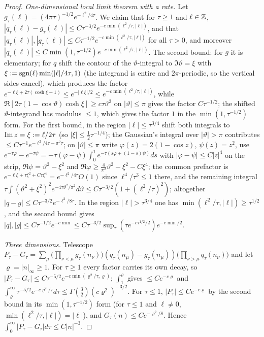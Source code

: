 \begin{proof}
\emph{One-dimensional local limit theorem with a rate.} Let $g_\tau(\ell)=(4\pi\tau)^{-1/2}e^{-\ell^2/4\tau}$. We claim that for $\tau\ge1$ and $\ell\in\mathbb Z$, $|q_\tau(\ell)-g_\tau(\ell)|\le C\tau^{-3/2}e^{-c\min(\ell^2/\tau,|\ell|)}$, and that $|q_\tau(\ell)|,|g_\tau(\ell)|\le C\tau^{-1/2}e^{-c\min(\ell^2/\tau,|\ell|)}$ for all $\tau>0$, and moreover $|q_\tau(\ell)|\le C\min(1,\tau^{-1/2})e^{-c\min(\ell^2/\tau,|\ell|)}$. The second bound: for $g$ it is elementary; for $q$ shift the contour of the $\vartheta$-integral to $\Im\vartheta=\xi$ with $\xi:=\operatorname{sgn}(\ell)\min(|\ell|/4\tau,1)$ (the integrand is entire and $2\pi$-periodic, so the vertical sides cancel), which produces the factor $e^{-\ell\xi+2\tau(\cosh\xi-1)}\le e^{-|\ell\xi|/2}\le e^{-c\min(\ell^2/\tau,|\ell|)}$, while $\Re[2\tau(1-\cos\vartheta)\cosh\xi]\ge c\tau\vartheta^2$ on $|\vartheta|\le\pi$ gives the factor $C\tau^{-1/2}$; the shifted $\vartheta$-integrand has modulus $\le1$, which gives the factor $1$ in the $\min(1,\tau^{-1/2})$ form. For the first bound, in the region $|\ell|\le\tau^{3/4}$ shift both integrals to $\operatorname{Im} z=\xi:=\ell/2\tau$ (so $|\xi|\le\frac12\tau^{-1/4}$); the Gaussian's integral over $|\vartheta|>\pi$ contributes $\le C\tau^{-1}e^{-\ell^2/4\tau-\pi^2\tau}$; on $|\vartheta|\le\pi$ write $\varphi(z)=2(1-\cos z)$, $\psi(z)=z^2$, use $e^{-\tau\varphi}-e^{-\tau\psi}=-\tau(\varphi-\psi)\int_0^1e^{-\tau(s\varphi+(1-s)\psi)}ds$ with $|\varphi-\psi|\le C|z|^4$ on the strip, $\Re\psi=\vartheta^2-\xi^2$ and $\Re\varphi\ge\frac4{\pi^2}\vartheta^2-\xi^2-C\xi^4$; the common prefactor is $e^{-\ell\xi+\tau\xi^2+C\tau\xi^4}=e^{-\ell^2/4\tau}O(1)$ since $\ell^4/\tau^3\le1$ there, and the remaining integral $\tau\int(\vartheta^2+\xi^2)^2e^{-4\tau\vartheta^2/\pi^2}d\vartheta\le C\tau^{-3/2}(1+(\ell^2/\tau)^2)$; altogether $|q-g|\le C\tau^{-3/2}e^{-\ell^2/8\tau}$. In the region $|\ell|>\tau^{3/4}$ one has $\min(\ell^2/\tau,|\ell|)\ge\tau^{1/2}$, and the second bound gives $|q|,|g|\le C\tau^{-1/2}e^{-c\min}\le C\tau^{-3/2}\sup_\tau(\tau e^{-c\tau^{1/2}/2})e^{-c\min/2}$.

\emph{Three dimensions.} Telescope $P_\tau-G_\tau=\sum_\mu\big(\prod_{\nu<\mu}g_\tau(n_\nu)\big)(q_\tau(n_\mu)-g_\tau(n_\mu))\big(\prod_{\nu>\mu}q_\tau(n_\nu)\big)$ and let $\varrho=|n|_\infty\ge1$. For $\tau\ge1$ every factor carries its own decay, so $|P_\tau-G_\tau|\le C\tau^{-5/2}e^{-c\min(\varrho^2/\tau,\varrho)}$; $\int_1^{\varrho}$ gives $\le Ce^{-c\varrho}$ and $\int_\varrho^\infty\tau^{-5/2}e^{-c\varrho^2/\tau}d\tau\le\Gamma(\frac32)(c\varrho^2)^{-3/2}$. For $\tau\le1$, $|P_\tau|\le Ce^{-c\varrho}$ by the second bound in its $\min(1,\tau^{-1/2})$ form (for $\tau\le1$ and $\ell\ne0$, $\min(\ell^2/\tau,|\ell|)=|\ell|$), and $G_\tau(n)\le Ce^{-\varrho^2/8}$. Hence $\int_0^\infty|P_\tau-G_\tau|d\tau\le C|n|^{-3}$.
\end{proof}

